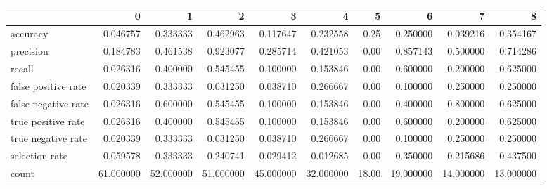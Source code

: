 \begin{tabular}{lrrrrrrrrr}
\toprule
{} &          0 &          1 &          2 &          3 &          4 &      5 &          6 &          7 &          8 \\
\midrule
accuracy            &   0.046757 &   0.333333 &   0.462963 &   0.117647 &   0.232558 &   0.25 &   0.250000 &   0.039216 &   0.354167 \\
precision           &   0.184783 &   0.461538 &   0.923077 &   0.285714 &   0.421053 &   0.00 &   0.857143 &   0.500000 &   0.714286 \\
recall              &   0.026316 &   0.400000 &   0.545455 &   0.100000 &   0.153846 &   0.00 &   0.600000 &   0.200000 &   0.625000 \\
false positive rate &   0.020339 &   0.333333 &   0.031250 &   0.038710 &   0.266667 &   0.00 &   0.100000 &   0.250000 &   0.250000 \\
false negative rate &   0.026316 &   0.600000 &   0.545455 &   0.100000 &   0.153846 &   0.00 &   0.400000 &   0.800000 &   0.625000 \\
true positive rate  &   0.026316 &   0.400000 &   0.545455 &   0.100000 &   0.153846 &   0.00 &   0.600000 &   0.200000 &   0.625000 \\
true negative rate  &   0.020339 &   0.333333 &   0.031250 &   0.038710 &   0.266667 &   0.00 &   0.100000 &   0.250000 &   0.250000 \\
selection rate      &   0.059578 &   0.333333 &   0.240741 &   0.029412 &   0.012685 &   0.00 &   0.350000 &   0.215686 &   0.437500 \\
count               &  61.000000 &  52.000000 &  51.000000 &  45.000000 &  32.000000 &  18.00 &  19.000000 &  14.000000 &  13.000000 \\
\bottomrule
\end{tabular}
